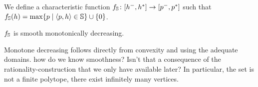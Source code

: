 {{{{We define a characteristic function $f_\mathbb{S}\colon [h^{-},h^{*}] \rightarrow [p^{-},p^{*}]$ such that $f_\mathbb{S}(h) = \max \{ p \mid \langle p, h \rangle \in \mathbb{S} \} \cup \{ 0 \}$.  
\begin{proposition}
	$f_\mathbb{S}$ is smooth monotonically decreasing. 
\end{proposition}
Monotone decreasing follows directly from convexity and using the adequate domains. 
{\color{red}how do we know smoothness? Isn't that a consequence of the rationality-construction that we only have available later?}
In particular, the set is not a finite polytope, there exist infinitely many vertices.


 
\begin{figure}
\centering
\begin{subfigure}{0.2\columnwidth}
\centering
{}
\caption{}
\end{subfigure}
\begin{subfigure}{0.38\columnwidth}
\centering
{}
\caption{}
\end{subfigure}
\begin{subfigure}{0.38\columnwidth}
\centering
{}
\caption{}
\end{subfigure}


\end{figure}}}}}
